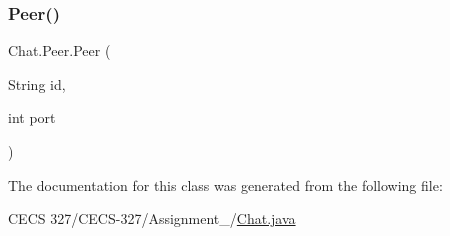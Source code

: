 \hypertarget{class_chat_1_1_peer_a9375050c0c6930ac28dc49cd9ded1029}{}\label{class_chat_1_1_peer_a9375050c0c6930ac28dc49cd9ded1029} 
\subsubsection{\texorpdfstring{Peer()}{Peer()}\hspace{0.1cm}{\footnotesize\ttfamily [2/2]}}
{\footnotesize\ttfamily Chat.\+Peer.\+Peer (\begin{DoxyParamCaption}\item[{String}]{id,  }\item[{int}]{port }\end{DoxyParamCaption})}



The documentation for this class was generated from the following file\+:\begin{DoxyCompactItemize}
\item 
C\+E\+C\+S 327/\+C\+E\+C\+S-\/327/\+Assignment\+\_/\hyperlink{_chat_8java}{Chat.\+java}\end{DoxyCompactItemize}
